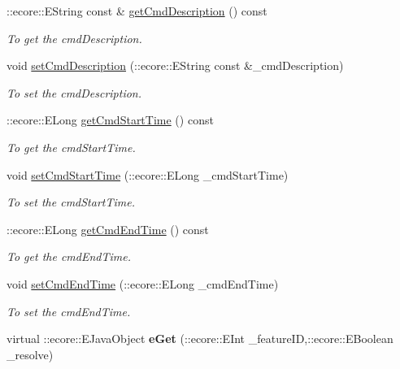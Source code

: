 \begin{DoxyCompactItemize}
::ecore::EString const \& \hyperlink{classUMS__Data_1_1Command_a0be53d1a263bae6f5967f5d3064eee3a}{getCmdDescription} () const 
\begin{DoxyCompactList}\small\item\em To get the cmdDescription. \item\end{DoxyCompactList}\item 
void \hyperlink{classUMS__Data_1_1Command_af2a848820c516ce55a54375d275c33de}{setCmdDescription} (::ecore::EString const \&\_\-cmdDescription)
\begin{DoxyCompactList}\small\item\em To set the cmdDescription. \item\end{DoxyCompactList}\item 
::ecore::ELong \hyperlink{classUMS__Data_1_1Command_ab85d89f247bd91683d526e63b78c10e9}{getCmdStartTime} () const 
\begin{DoxyCompactList}\small\item\em To get the cmdStartTime. \item\end{DoxyCompactList}\item 
void \hyperlink{classUMS__Data_1_1Command_a8ea4e21e6b576dc1de3b3ef1a88448d5}{setCmdStartTime} (::ecore::ELong \_\-cmdStartTime)
\begin{DoxyCompactList}\small\item\em To set the cmdStartTime. \item\end{DoxyCompactList}\item 
::ecore::ELong \hyperlink{classUMS__Data_1_1Command_a8ce2ee67b02e572490af6a803129d85b}{getCmdEndTime} () const 
\begin{DoxyCompactList}\small\item\em To get the cmdEndTime. \item\end{DoxyCompactList}\item 
void \hyperlink{classUMS__Data_1_1Command_a5b75d77a48a6384a7cb0a3c0ebde745b}{setCmdEndTime} (::ecore::ELong \_\-cmdEndTime)
\begin{DoxyCompactList}\small\item\em To set the cmdEndTime. \item\end{DoxyCompactList}\item 
\hypertarget{classUMS__Data_1_1Command_a07a8cb4e04bb1257bd15d87e2ab3a278}{
virtual ::ecore::EJavaObject {\bfseries eGet} (::ecore::EInt \_\-featureID,::ecore::EBoolean \_\-resolve)}
\label{classUMS__Data_1_1Command_a07a8cb4e04bb1257bd15d87e2ab3a278}


\end{DoxyCompactItemize}
